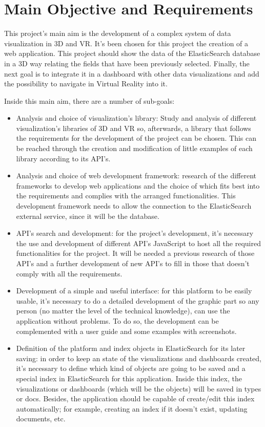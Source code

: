 \documentclass[a4paper, 12pt]{book}
\begin{document}
\section{Main Objective and Requirements}
\label{sec:mainobj}


This project's main aim is the development of a complex system of data visualization in 3D and VR. It's been chosen for this project the creation of a web application. This project should show the data of the ElasticSearch database in a 3D way relating the fields that have been previously selected. Finally, the next goal is to integrate it in a dashboard with other data visualizations and add the possibility to navigate in Virtual Reality into it.

Inside this main aim, there are a number of sub-goals:

\begin{itemize}
\item Analysis and choice of visualization's library: Study and analysis of different visualization's libraries of 3D and VR so, afterwards, a library that follows the requirements for the development of the project can be chosen. This can be reached through the creation and modification of little examples of each library according to its API's.
\item Analysis and choice of web development framework: research of the different frameworks to develop web applications and the choice of which fits best into the requirements and complies with the arranged functionalities. This development framework needs to allow the connection to the ElasticSearch external service, since it will be the database.
\item API's search and development: for the project's development, it's necessary the use and development of different API's JavaScript to host all the required functionalities for the project. It will be needed a previous research of those API's and a further development of new API's to fill in those that doesn't comply with all the requirements.
\item Development of a simple and useful interface: for this platform to be easily usable, it's necessary to do a detailed development of the graphic part so any person (no matter the level of the technical knowledge), can use the application without problems. To do so, the development can be complemented with a user guide and some examples with screenshots.
\item Definition of the platform and index objects in ElasticSearch for its later saving: in order to keep an state of the visualizations and dashboards created, it's necessary to define which kind of objects are going to be saved and a special index in ElasticSearch for this application. Inside this index, the visualizations or dashboards (which will be the objects) will be saved in types or docs. Besides, the application should be capable of create/edit this index automatically; for example, creating an index if it doesn't exist, updating documents, etc.

\end{itemize}
\end{document}
